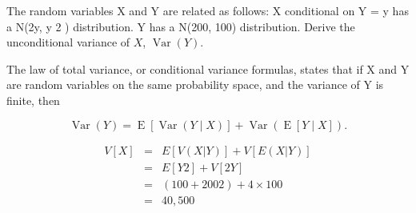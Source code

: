 \documentclass[a4paper,12pt]{article}
\begin{document}
 The random variables X and Y are related as follows:
X conditional on Y = y has a N(2y, y 2 ) distribution.
Y has a N(200, 100) distribution.
Derive the unconditional variance of $X$, $\operatorname {Var} (Y)$.

\begin{framed}
\noindent The law of total variance, or conditional variance formulas, states that if X and Y are random variables on the same probability space, and the variance of Y is finite, then

\[  {\displaystyle \operatorname {Var} (Y)=\operatorname {E} [\operatorname {Var} (Y\mid X)]+\operatorname {Var} (\operatorname {E} [Y\mid X]).} \]

\end{framed}

\begin{eqnarray*}
V[X]
&=& E[V(X|Y)] + V[E(X|Y)]\\
&=& E[Y 2 ] + V[2Y] \\ 
&=& (100 + 200 2 ) + 4\times 100 \\ 
&=& 40,500\\
\end{eqnarray*}
\end{document}
